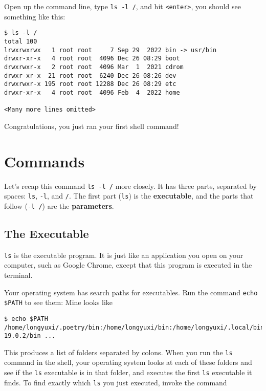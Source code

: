 \documentclass[12pt,letterpaper]{article}
\begin{document}
Open up the command line, type \texttt{ls -l /}, and hit \texttt{<enter>}, you should see something like this:


\begin{verbatim}
$ ls -l /
total 100
lrwxrwxrwx   1 root root     7 Sep 29  2022 bin -> usr/bin
drwxr-xr-x   4 root root  4096 Dec 26 08:29 boot
drwxrwxr-x   2 root root  4096 Mar  1  2021 cdrom
drwxr-xr-x  21 root root  6240 Dec 26 08:26 dev
drwxrwxr-x 195 root root 12288 Dec 26 08:29 etc
drwxr-xr-x   4 root root  4096 Feb  4  2022 home

<Many more lines omitted>
\end{verbatim}

Congratulations, you just ran your first shell command!

\section{Commands}

Let's recap this command \texttt{ls -l /} more closely. It has three parts, separated by spaces: \texttt{ls}, \texttt{-l}, and \texttt{/}. The first part (\texttt{ls}) is the \textbf{executable}, and the parts that follow (\texttt{-l /}) are the \textbf{parameters}.

\subsection{The Executable}

\texttt{ls} is the executable program. It is just like an application you open on your computer, such as Google Chrome, except that this program is executed in the terminal.

Your operating system has search paths for executables. Run the command \texttt{echo \$PATH} to see them: Mine looks like

\begin{verbatim}
$ echo $PATH
/home/longyuxi/.poetry/bin:/home/longyuxi/bin:/home/longyuxi/.local/bin:/usr/local/sbin:/usr/local/bin:/usr/sbin:/usr/bin:/sbin:/bin:/usr/games:/usr/local/games:/snap/bin:/home/longyuxi/bin:/home/longyuxi/java/jdk-19.0.2/bin ...
\end{verbatim}

This produces a list of folders separated by colons. When you run the \texttt{ls} command in the shell, your operating system looks at each of these folders and see if the \texttt{ls} executable is in that folder, and executes the first \texttt{ls} executable it finds. To find exactly which \texttt{ls} you just executed, invoke the command
\end{document}

